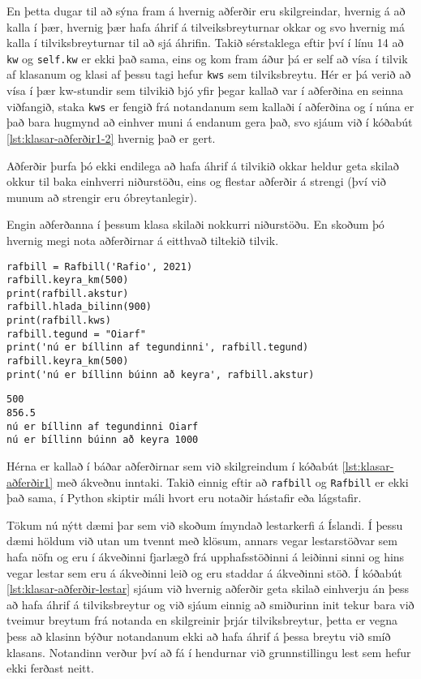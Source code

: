 En þetta dugar til að sýna fram á hvernig aðferðir eru skilgreindar, hvernig á að kalla í þær, hvernig þær hafa áhrif á tilveiksbreyturnar okkar og svo hvernig má kalla í tilviksbreyturnar til að sjá áhrifin.
Takið sérstaklega eftir því í línu 14 að \texttt{kw} og \texttt{self.kw} er ekki það sama, eins og kom fram áður þá er self að vísa í tilvik af klasanum og klasi af þessu tagi hefur \texttt{kws} sem tilviksbreytu.
Hér er þá verið að vísa í þær kw-stundir sem tilvikið bjó yfir þegar kallað var í aðferðina en seinna viðfangið, staka \texttt{kws} er fengið frá notandanum sem kallaði í aðferðina og í núna er það bara hugmynd að einhver muni á endanum gera það, svo sjáum við í kóðabút \ref{lst:klasar-aðferðir1-2} hvernig það er gert.

Aðferðir þurfa þó ekki endilega að hafa áhrif á tilvikið okkar heldur geta skilað okkur til baka einhverri niðurstöðu, eins og flestar aðferðir á strengi (því við munum að strengir eru óbreytanlegir).

Engin aðferðanna í þessum klasa skilaði nokkurri niðurstöðu.
En skoðum þó hvernig megi nota aðferðirnar á eitthvað tiltekið tilvik.

\begin{lstlisting}[caption=Tilvik af rafbílaklasanum búið til og notað, label=lst:klasar-aðferðir1-2]
rafbill = Rafbill('Rafio', 2021) 
rafbill.keyra_km(500)
print(rafbill.akstur) 
rafbill.hlada_bilinn(900)
print(rafbill.kws)
rafbill.tegund = "Oiarf"
print('nú er bíllinn af tegundinni', rafbill.tegund)
rafbill.keyra_km(500)
print('nú er bíllinn búinn að keyra', rafbill.akstur)
\end{lstlisting}
\lstset{style=uttak}
\begin{lstlisting}
500
856.5
nú er bíllinn af tegundinni Oiarf
nú er bíllinn búinn að keyra 1000
\end{lstlisting}
\lstset{style=venjulegt}

Hérna er kallað í báðar aðferðirnar sem við skilgreindum í kóðabút \ref{lst:klasar-aðferðir1} með ákveðnu inntaki.
Takið einnig eftir að \texttt{rafbill} og \texttt{Rafbill} er ekki það sama, í Python skiptir máli hvort eru notaðir hástafir eða lágstafir. 

Tökum nú nýtt dæmi þar sem við skoðum ímyndað lestarkerfi á Íslandi.
Í þessu dæmi höldum við utan um tvennt með klösum, annars vegar lestarstöðvar sem hafa nöfn og eru í ákveðinni fjarlægð frá upphafsstöðinni á leiðinni sinni og hins vegar lestar sem eru á ákveðinni leið og eru staddar á ákveðinni stöð.
Í kóðabút \ref{lst:klasar-aðferðir-lestar} sjáum við hvernig aðferðir geta skilað einhverju án þess að hafa áhrif á tilviksbreytur og við sjáum einnig að smiðurinn init tekur bara við tveimur breytum frá notanda en skilgreinir þrjár tilviksbreytur, þetta er vegna þess að klasinn býður notandanum ekki að hafa áhrif á þessa breytu við smíð klasans.
Notandinn verður því að fá í hendurnar við grunnstillingu lest sem hefur ekki ferðast neitt.

